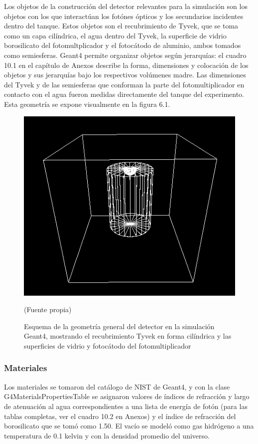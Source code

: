 \documentclass{book}
\begin{document}
Los objetos de la construcci\'on del detector relevantes para la simulaci\'on son los objetos con los que interact\'uan los fot\'ones \'opticos y los secundarios incidentes dentro del tanque. Estos objetos son el recubrimiento de Tyvek, que se toma como un capa cil\'indrica, el agua dentro del Tyvek, la superficie de vidrio borosilicato del fotomultplicador y el fotoc\'atodo de aluminio, ambos tomados como semiesferas. Geant4 permite organizar objetos seg\'un jerarqu\'ias: el cuadro 10.1 en el cap\'itulo de Anexos describe la forma, dimensiones y colocaci\'on de los objetos y sus jerarqu\'ias bajo los respectivos vol\'umenes madre. Las dimensiones del Tyvek y de las semiesferas que conforman la parte del fotomultiplicador en contacto con el agua fueron medidas directamente del tanque del experimento. Esta geometr\'ia se expone visualmente en la figura 6.1.

\begin{figure}[h] %
\begin{center}
 \includegraphics[width = 0.5\linewidth]{GeometriaG4.png}
 
(Fuente propia)
\caption{Esquema de la geometr\'ia general del detector en la simulaci\'on Geant4, mostrando el recubrimiento Tyvek en forma cil\'indrica y las superficies de vidrio y fotoc\'atodo del fotomultiplicador}
\end{center}
\end{figure}

\subsubsection{Materiales}
Los materiales se tomaron del cat\'alogo de NIST de Geant4, y con la clase G4MaterialsPropertiesTable se asignaron valores de \'indices de refracci\'on y largo de atenuaci\'on al agua correspondientes a una lista de energ\'ia de fot\'on (para las tablas completas, ver el cuadro 10.2 en Anexos) y el \'indice de refracci\'on del borosilicato que se tom\'o como 1.50. El vac\'io se model\'o como gas hidr\'ogeno a una temperatura de 0.1 kelvin y con la densidad promedio del universo.
\end{document}
